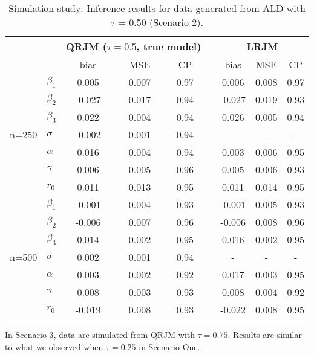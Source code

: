 \begin{table}[H]
\centering
\caption{Simulation study: Inference results for data generated from ALD with $\tau$ = 0.50 (Scenario 2).}
\label{tab:p2simsce2}
\begin{tabular}{clccccccc}
\hline
& & \multicolumn{3}{c}{QRJM ($\tau=0.5$, true model)} & & \multicolumn{3}{c}{LRJM}\\
\hline
 & & bias & MSE & CP && bias & MSE & CP \\
 \cline{3-5}  \cline{7-9}
  \multirow{7}{*}{n=250} & $\beta_1$ & 0.005 & 0.007 & 0.97 && 0.006 & 0.008 & 0.97 \\
  & $\beta_2$ & -0.027 & 0.017 & 0.94 && -0.027 & 0.019 & 0.93 \\
  & $\beta_3$ & 0.022 & 0.004 & 0.94 && 0.026 & 0.005 & 0.94 \\
  & $\sigma$ & -0.002 & 0.001 & 0.94 &&  - & - & - \\
  & $\alpha$ & 0.016 & 0.004 & 0.94 && 0.003 & 0.006 & 0.95 \\
  & $\gamma$ & 0.006 & 0.005 & 0.96 && 0.005 & 0.006 & 0.93 \\
  & $r_0$ & 0.011 & 0.013 & 0.95 && 0.011 & 0.014 & 0.95 \\
   \hline
 \multirow{7}{*}{n=500} & $\beta_1$ & -0.001 & 0.004 & 0.93 && -0.001 & 0.005 & 0.93 \\
  & $\beta_2$ & -0.006 & 0.007 & 0.96 && -0.006 & 0.008 & 0.96 \\
  & $\beta_3$ & 0.014 & 0.002 & 0.95 && 0.016 & 0.002 & 0.95 \\
  & $\sigma$ & 0.002 & 0.001 & 0.94 &&  - & - & - \\
  & $\alpha$ & 0.003 & 0.002 & 0.92 && 0.017 & 0.003 & 0.95 \\
  & $\gamma$ & 0.008 & 0.003 & 0.93 && 0.008 & 0.004 & 0.92 \\
  & $r_0$ & -0.019 & 0.008 & 0.93 && -0.022 & 0.008 & 0.95 \\
   \hline
\end{tabular}
\end{table}



In Scenario 3, data are simulated from QRJM with $\tau=0.75$. Results are similar to what we observed when $\tau=0.25$ in Scenario One.

